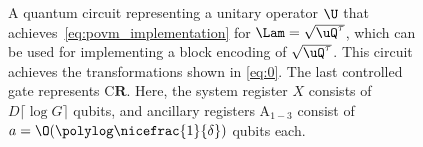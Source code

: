 %   
\begin{figure}[!ht]
  \centering
  
  \caption{A quantum circuit representing a unitary operator $\U$ that achieves~\cref{eq:povm_implementation} for $\Lam=\sqrt{\uQ^{\tau}}$, which can be used for implementing a block encoding of $\sqrt{\uQ^{\tau}}$. This circuit achieves the transformations shown in \cref{eq:0}. The last controlled gate represents $\mathrm{C}\mathbf{R}$. Here, the system register $X$ consists of $D\lceil\log G\rceil$ qubits, and ancillary registers A$_{1-3}$ consist of $a=\O(\polylog\nicefrac{1}{\delta})$ qubits each.}
  \label{fig:q_tau}
  \end{figure}



